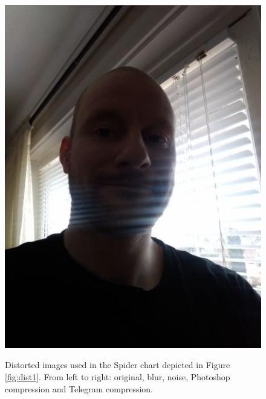 \begin{figure}[h]
    \subfloat
        {\includegraphics[scale = 0.13]{figures/0329telegram_compression.png}}
    \caption{Distorted images used in the Spider chart depicted in Figure \ref{fig:dist1}. From left to right: original, blur, noise, Photoshop compression and Telegram compression.}
    \label{fig:Distorted1}
\end{figure}


